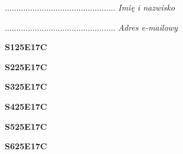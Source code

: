 \begin{turn}{90}\begin{minipage}{\linewidth} \vspace{20mm} ................................................  \textit{Imię i nazwisko}\end{minipage}\end{turn}

\begin{turn}{90}\begin{minipage}{\linewidth} \vspace{20mm} ................................................  \textit{Adres e-mailowy}\end{minipage}\end{turn}

\begin{turn}{90}\huge \begin{minipage}{\linewidth} \vspace{10mm}\textbf{S125E17C}\end{minipage}\end{turn}

\begin{turn}{90}\huge \begin{minipage}{\linewidth} \vspace{10mm}\textbf{S225E17C}\end{minipage}\end{turn}

\begin{turn}{90}\huge \begin{minipage}{\linewidth} \vspace{10mm}\textbf{S325E17C}\end{minipage}\end{turn}

\begin{turn}{90}\huge \begin{minipage}{\linewidth} \vspace{10mm}\textbf{S425E17C}\end{minipage}\end{turn}

\begin{turn}{90}\huge \begin{minipage}{\linewidth} \vspace{10mm}\textbf{S525E17C}\end{minipage}\end{turn}

\begin{turn}{90}\huge \begin{minipage}{\linewidth} \vspace{10mm}\textbf{S625E17C}\end{minipage}\end{turn}

